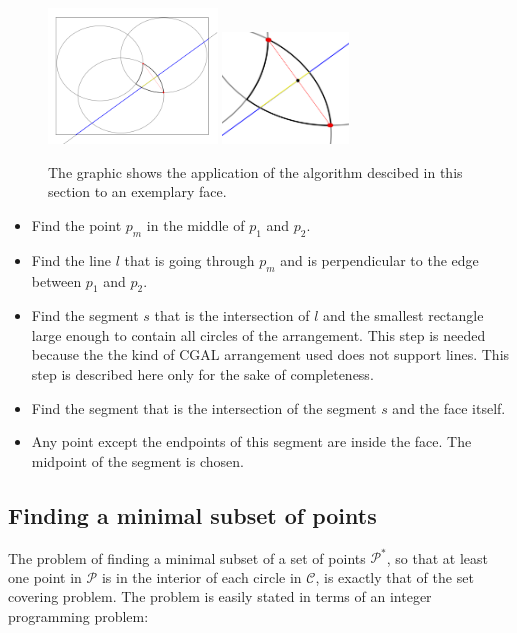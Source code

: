 \documentclass[a4paper,12pt]{article}
\begin{document}
\begin{figure}[hb]
\includegraphics[width=0.4\textwidth]{pictures/PointInFace.png}
\includegraphics[width=0.3\textwidth]{pictures/PointInFace2.png}
 \caption[Close up of \textit{Hemidactylus} sp.]
   {The graphic shows the application of the algorithm descibed in this section to an exemplary face.}
\end{figure}
\begin {itemize}
\item
Find the point $p_m$ in the middle of $p_1$ and $p_2$.
\item
Find the line $l$ that is going through $p_m$ and is perpendicular to the edge between $p_1$ and $p_2$.
\item
Find the segment $s$ that is the intersection of $l$ and the smallest rectangle large enough to contain all circles of the arrangement. This step is needed because the the kind of CGAL arrangement used does not support lines. This step is described here only for the sake of completeness.
\item
Find the segment that is the intersection of the segment $s$ and the face itself.
\item
Any point except the endpoints of this segment are inside the face. The midpoint of the segment is chosen.
\end{itemize}

\subsection{Finding a minimal subset of points}
\label{sec:gurobi}
The problem of finding a minimal subset of a set of points $\mathcal P^*$, so that at least one point in $\mathcal P$ is in the interior of each circle in $\mathcal C$, is exactly that of the set covering problem. The problem is easily stated in terms of an integer programming problem:
\end{document}
